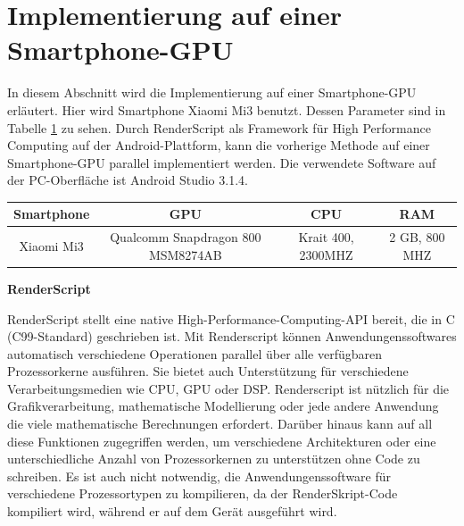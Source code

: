 


\section{Implementierung auf einer Smartphone-GPU}

In diesem Abschnitt wird die Implementierung auf einer Smartphone-GPU erläutert. Hier wird Smartphone Xiaomi Mi3 benutzt. Dessen Parameter sind in Tabelle \ref{tbl:Grundlegende Parameter für Mi3} zu sehen. Durch RenderScript als Framework für High Performance Computing auf der Android-Plattform, kann die vorherige Methode auf einer Smartphone-GPU parallel implementiert werden. Die verwendete Software auf der PC-Oberfläche ist Android Studio 3.1.4.

\begin{table}[htb]
	\label{tbl:Grundlegende Parameter für Mi3}
	\footnotesize
	\centering
	\begin{tabular}{|c|c|c|c|}
	\toprule
	\textbf{Smartphone} & \textbf{GPU} & \textbf{CPU} & \textbf{RAM}\\
	\midrule
	Xiaomi Mi3  & Qualcomm Snapdragon 800 MSM8274AB & Krait 400, 2300MHZ & 2 GB, 800 MHZ \\
	\bottomrule
	\end{tabular}
\end{table} 

\textbf{RenderScript}

RenderScript stellt eine native High-Performance-Computing-API bereit, die in C (C99-Standard) geschrieben ist. Mit Renderscript können Anwendungenssoftwares automatisch verschiedene Operationen parallel über alle verfügbaren Prozessorkerne ausführen. Sie bietet auch Unterstützung für verschiedene Verarbeitungsmedien wie CPU, GPU oder DSP. Renderscript ist nützlich für die Grafikverarbeitung, mathematische Modellierung oder jede andere Anwendung die viele mathematische Berechnungen erfordert. Darüber hinaus kann auf all diese Funktionen zugegriffen werden, um verschiedene Architekturen oder eine unterschiedliche Anzahl von Prozessorkernen zu unterstützen ohne Code zu schreiben. Es ist auch nicht notwendig, die Anwendungenssoftware für verschiedene Prozessortypen zu kompilieren, da der RenderSkript-Code kompiliert wird, während er auf dem Gerät ausgeführt wird.

